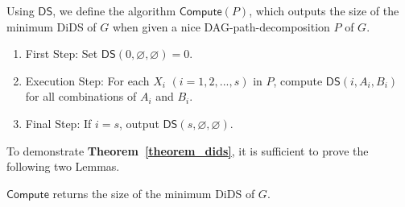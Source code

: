 \documentclass[runningheads]{llncs}
\theoremstyle{plain}
\theoremstyle{definition}
\begin{document}
Using $\mathsf{DS}$, we define the algorithm $\mathsf{Compute}(P)$, which outputs the size of the minimum DiDS of $G$ when given a nice DAG-path-decomposition $P$ of $G$.

\begin{enumerate}
    \item First Step: Set $\mathsf{DS}(0, \varnothing, \varnothing) = 0$.
    \item Execution Step: For each $X_i$ $(i=1, 2, ..., s)$ in $P$, compute $\mathsf{DS}(i, A_i, B_i)$ for all combinations of $A_i$ and $B_i$.
    \item Final Step: If $i = s$, output $\mathsf{DS}(s, \varnothing, \varnothing)$.
\end{enumerate}

To demonstrate \textbf{Theorem~\ref{theorem_dids}}, it is sufficient to prove the following two Lemmas.

\begin{lemma}\label{dids}
    $\mathsf{Compute}$ returns the size of the minimum DiDS of $G$.
\end{lemma}
\end{document}
